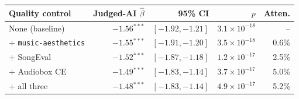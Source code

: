 \begin{tabular}{lrrrr}
\toprule
\textbf{Quality control} & \textbf{Judged-AI $\hat\beta$} & \textbf{95\% CI} & \textbf{$p$} & \textbf{Atten.} \\
\midrule
None (baseline) & $-1.56$$^{***}$ & $[-1.92, -1.21]$ & $3.1\times 10^{-18}$ & -- \\
$+$ \texttt{music-aesthetics} & $-1.55$$^{***}$ & $[-1.91, -1.20]$ & $3.5\times 10^{-18}$ & 0.6\% \\
$+$ SongEval & $-1.52$$^{***}$ & $[-1.87, -1.18]$ & $1.2\times 10^{-17}$ & 2.5\% \\
$+$ Audiobox CE & $-1.49$$^{***}$ & $[-1.83, -1.14]$ & $3.7\times 10^{-17}$ & 5.0\% \\
$+$ all three & $-1.48$$^{***}$ & $[-1.83, -1.14]$ & $4.9\times 10^{-17}$ & 5.2\% \\
\bottomrule
\end{tabular}
